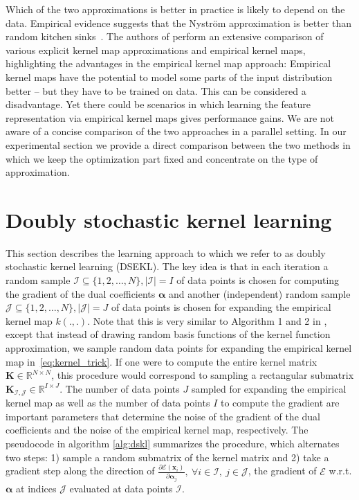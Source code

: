 \documentclass{article} %
\newcommand{\R}{\ensuremath{\mathds{R}}}
\newcommand{\va}{\boldsymbol{\alpha}}
\renewcommand{\vec}[1]{\mathbf{#1}}
\begin{document}
Which of the two approximations is better in practice is likely to depend on the data. Empirical evidence suggests that the Nystr\"om approximation is better than random kitchen sinks~\cite{Yang2012}. The authors of \cite{Vedaldi2010} perform an extensive comparison of various explicit kernel map approximations and empirical kernel maps, highlighting the advantages in the empirical kernel map approach: Empirical kernel maps have the potential to model some parts of the input distribution better -- but they have to be trained on data. This can be considered a disadvantage. Yet there could be scenarios in which learning the feature representation via empirical kernel maps gives performance gains. We are not aware of a concise comparison of the two approaches in a parallel setting. In our experimental section we provide a direct comparison between the two methods in which we keep the optimization part fixed and concentrate on the type of approximation. 
%
\section{Doubly stochastic kernel learning}\label{sec:dskl}
This section describes the learning approach to which we refer to as doubly stochastic kernel learning (DSEKL). The key idea is that in each iteration a random sample $\mathcal{I}\subseteq\{1,2,\dots,N\}, |\mathcal{I}|=I$ of data points is chosen for computing the gradient of the dual coefficients $\va$ and another (independent) random sample $\mathcal{J}\subseteq\{1,2,\dots,N\}, |\mathcal{J}|=J$ of data points is chosen for expanding the empirical kernel map $k(.,.)$. Note that this is very similar to Algorithm 1 and 2 in \cite{Dai2014}, except that instead of drawing random basis functions of the kernel function approximation, we sample random data points for expanding the empirical kernel map in~\autoref{eq:kernel_trick}. If one were to compute the entire kernel matrix $\vec{K}\in\R^{N\times N}$, this procedure would correspond to sampling a rectangular submatrix $\vec{K}_{\mathcal{I,J}}\in\R^{I\times J}$. The number of data points $J$ sampled for expanding the empirical kernel map as well as the number of data points $I$ to compute the gradient are important parameters that determine the noise of the gradient of the dual coefficients and the noise of the empirical kernel map, respectively. The pseudocode in algorithm \autoref{alg:dskl} summarizes the procedure, which alternates two steps: 1) sample a random submatrix of the kernel matrix and 2) take a gradient step along the direction of $\frac{\partial\mathcal{E}(\vec{x}_i)}{\partial \va_{j}},~\forall i\in \mathcal{I},~j\in\mathcal{J} $, the gradient of $\mathcal{E}$ w.r.t. $\va$ at indices $\mathcal{J}$ evaluated at data points $\mathcal{I}$.
\end{document}
